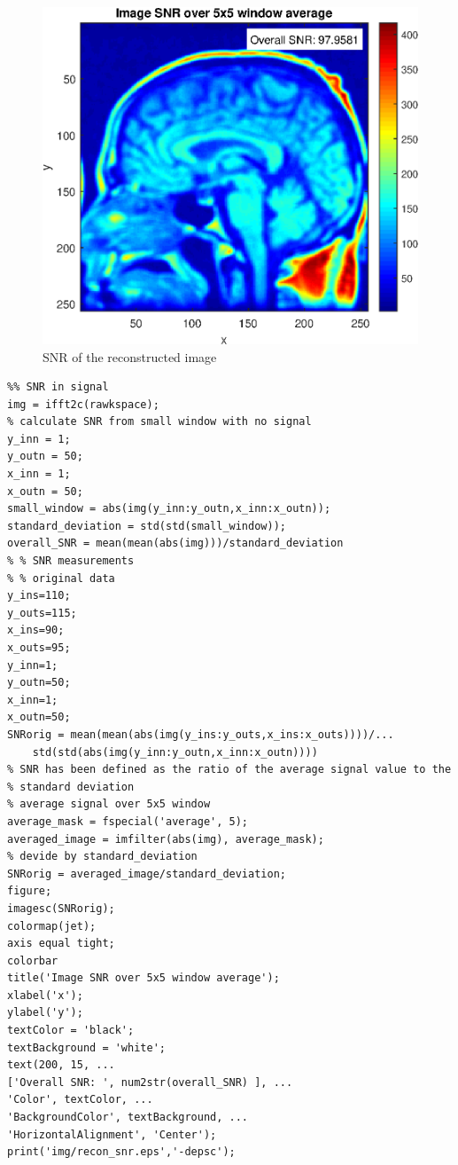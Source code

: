 \begin{figure}[h!]
    \centering
    \includegraphics[width=\linewidth]{./homework4/img/recon_snr.eps}
    \caption{SNR of the reconstructed image}
    \label{fig:recon_phase}
\end{figure}




\begin{lstlisting}
%% SNR in signal
img = ifft2c(rawkspace);
% calculate SNR from small window with no signal
y_inn = 1;
y_outn = 50;
x_inn = 1;
x_outn = 50;
small_window = abs(img(y_inn:y_outn,x_inn:x_outn));
standard_deviation = std(std(small_window));
overall_SNR = mean(mean(abs(img)))/standard_deviation
% % SNR measurements
% % original data
y_ins=110;
y_outs=115;
x_ins=90;
x_outs=95;
y_inn=1;
y_outn=50;
x_inn=1;
x_outn=50;
SNRorig = mean(mean(abs(img(y_ins:y_outs,x_ins:x_outs))))/...
    std(std(abs(img(y_inn:y_outn,x_inn:x_outn))))
% SNR has been defined as the ratio of the average signal value to the
% standard deviation
% average signal over 5x5 window
average_mask = fspecial('average', 5);
averaged_image = imfilter(abs(img), average_mask);
% devide by standard_deviation
SNRorig = averaged_image/standard_deviation;
figure;
imagesc(SNRorig);
colormap(jet);
axis equal tight;
colorbar
title('Image SNR over 5x5 window average');
xlabel('x');
ylabel('y');
textColor = 'black';
textBackground = 'white';
text(200, 15, ...
['Overall SNR: ', num2str(overall_SNR) ], ...
'Color', textColor, ...
'BackgroundColor', textBackground, ...
'HorizontalAlignment', 'Center');
print('img/recon_snr.eps','-depsc');
\end{lstlisting}





